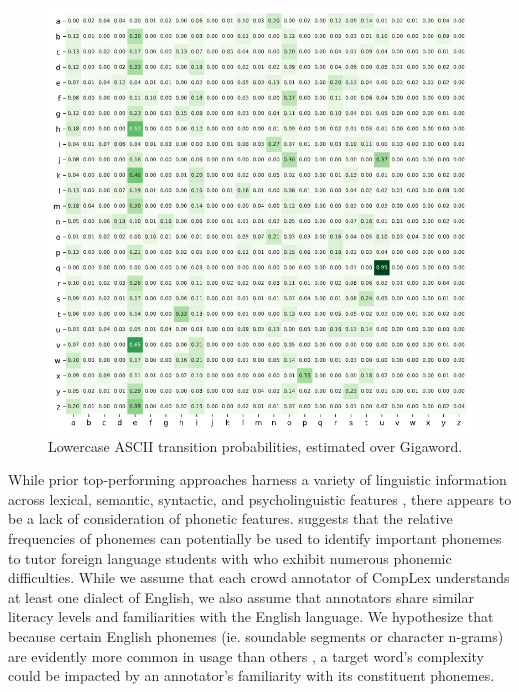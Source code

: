 \documentclass{dcthesis}
\theoremstyle{definition}
\theoremstyle{remark}
\begin{document}
\begin{figure}
  \centering
  \includegraphics[scale=0.55]{character_transition_probabilities.png}
  \captionsetup{justification=centering}
  \caption{\label{fig:character_transition_probabilities} Lowercase ASCII transition probabilities, estimated over Gigaword.}
\end{figure}

While prior top-performing approaches harness a variety of linguistic information across lexical, semantic, syntactic, and psycholinguistic features \citep{paetzold2016sv000gg, ronzano2016taln, mukherjee2016ju_nlp}, there appears to be a lack of consideration of phonetic features. \citet{hayden1950relative} suggests that the relative frequencies of phonemes can potentially be used to identify important phonemes to tutor foreign language students with who exhibit numerous phonemic difficulties. While we assume that each crowd annotator of CompLex understands at least one dialect of English, we also assume that annotators share similar literacy levels and familiarities with the English language. We hypothesize that because certain English phonemes (ie. soundable segments or character n-grams) are evidently more common in usage than others \citep{hayden1950relative}, a target word's complexity could be impacted by an annotator's familiarity with its constituent phonemes.
\end{document}

